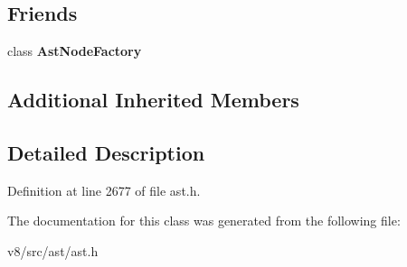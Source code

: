 \subsection*{Friends}
\begin{DoxyCompactItemize}
\item 
\mbox{\label{classv8_1_1internal_1_1NativeFunctionLiteral_a8d587c8ad3515ff6433eb83c578e795f}} 
class {\bfseries Ast\+Node\+Factory}
\end{DoxyCompactItemize}
\subsection*{Additional Inherited Members}


\subsection{Detailed Description}


Definition at line 2677 of file ast.\+h.



The documentation for this class was generated from the following file\+:\begin{DoxyCompactItemize}
\item 
v8/src/ast/ast.\+h\end{DoxyCompactItemize}
